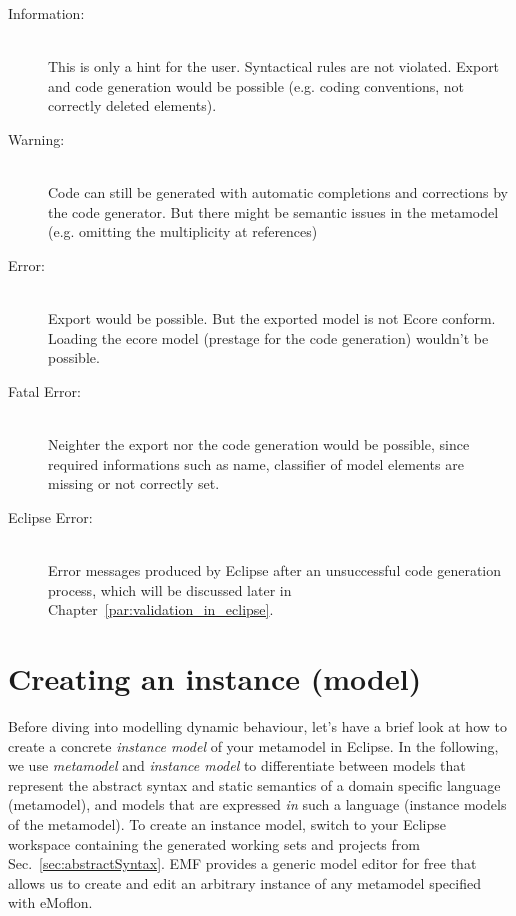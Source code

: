 \begin{description}
  \item[Information:]~\\ This is only a hint for the user. Syntactical rules are not violated. Export and code generation would be possible (e.g. coding conventions, not correctly deleted elements).
  \item[Warning:]~\\ Code can still be generated with automatic completions and corrections by the code generator. 
  But there might be semantic issues in the metamodel (e.g. omitting the multiplicity at references)
  \item[Error:]~\\ Export would be possible. 
  But the exported model is not Ecore conform. Loading the ecore model (prestage for the code generation) wouldn't be possible.
  \item[Fatal Error:]~\\ Neighter the export nor the code generation would be possible, since required informations such as name, classifier of model elements are missing or not correctly set.
  \item[Eclipse Error:]~\\ Error messages produced by Eclipse after an unsuccessful code generation process, which will be discussed later in Chapter~\ref{par:validation_in_eclipse}.

\end{description}

\section{Creating an instance (model)}
\label{sect:instance}

Before diving into modelling dynamic behaviour, let's have a brief look at how to create a concrete \emph{instance model} of your metamodel in Eclipse.
In the following, we use \emph{metamodel} and \emph{instance model} to differentiate between models that represent the abstract syntax and static semantics of a domain specific language (metamodel), and models that are expressed \emph{in} such a language (instance models of the metamodel).
To create an instance model, switch to your Eclipse workspace containing the generated working sets and projects from Sec.~\ref{sec:abstractSyntax}.
EMF provides a generic model editor for free that allows us to create and edit an arbitrary instance of any metamodel specified with eMoflon. 

